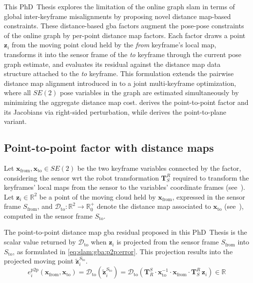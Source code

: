 This PhD~Thesis explores the limitation of the online graph \gls{slam} in terms
of global inter-keyframe misalignments by proposing novel distance map-based
 constraints. These distance-based \gls{gba}
factors augment the pose-pose constraints of the online graph by
per-point distance map factors. Each factor draws a point $\mathbf{z}_i$ from
the moving point cloud held by the \emph{from} keyframe's local map, transforms
it into the sensor frame of the \emph{to} keyframe through the current pose
graph estimate, and evaluates its residual against the distance map data
structure attached to the \emph{to} keyframe. This formulation extends
the pairwise distance map alignment introduced in
 to a joint multi-keyframe optimization,
where all $SE(2)$ pose variables in the graph are estimated simultaneously by
minimizing the aggregate distance map cost.  derives
the point-to-point factor and its Jacobians via right-sided perturbation, while
 derives the point-to-plane variant.

\subsection{Point-to-point factor with distance maps}
\label{sec:slam:gba:p2p}

Let $\mathbf{x}_{\mathrm{from}},\mathbf{x}_{\mathrm{to}}\in SE(2)$ be the
two keyframe variables connected by the factor, considering the sensor \gls{wrt}
the robot transformation $\mathbf{T}_S^R$ required to transform the keyframes'
local maps from the sensor to the variables' coordinate frames
(see~).
Let $\mathbf{z}_i\in\mathbb{R}^2$ be a point of the
moving cloud held by $\mathbf{x}_{\mathrm{from}}$, expressed in the sensor
frame $S_{\mathrm{from}}$, and
$\mathcal{D}_{\mathrm{to}}: \mathbb{R}^2 \to \mathbb{R}_0^+$ denote the
distance map associated to $\mathbf{x}_{\mathrm{to}}$
(see~), computed in the sensor
frame $S_{\mathrm{to}}$.

The point-to-point distance map \gls{gba} residual proposed in this PhD~Thesis
is the scalar value returned by $\mathcal{D}_{\mathrm{to}}$ when $\mathbf{z}_i$
is projected from the sensor frame $S_{\mathrm{from}}$ into $S_{\mathrm{to}}$,
as formulated in \eqref{eq:slam:gba:p2p:error}. This projection results into
the projected moving point $\tilde{\mathbf{z}}_i^{S_{\mathrm{to}}}$.
\begin{equation}
\label{eq:slam:gba:p2p:error}
e_i^{\mathrm{p2p}}\!\left(\mathbf{x}_{\mathrm{from}},\mathbf{x}_{\mathrm{to}}\right) =
\mathcal{D}_{\mathrm{to}}\!\left(\tilde{\mathbf{z}}_i^{S_{\mathrm{to}}}\right) =
\mathcal{D}_{\mathrm{to}}\!\left(
  \mathbf{T}_R^S\cdot\mathbf{x}_{\mathrm{to}}^{-1}\cdot
  \mathbf{x}_{\mathrm{from}}\cdot\mathbf{T}_S^R\,\mathbf{z}_i
\right) \in \mathbb{R}
\end{equation}

